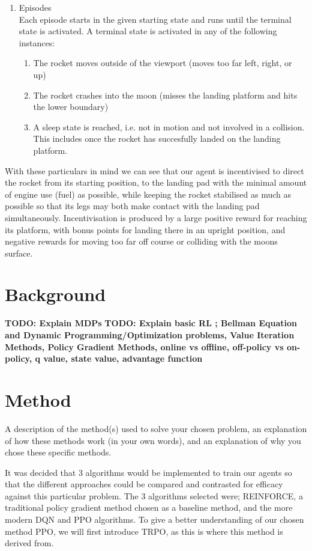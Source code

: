 \documentclass{article}
\begin{document}
\begin{enumerate}
  \item Episodes\\
  Each episode starts in the given starting state and runs until the terminal state is activated. A terminal state is activated in any of the following instances:
  \begin{enumerate}
    \item The rocket moves outside of the viewport (moves too far left, right, or up)
    \item The rocket crashes into the moon (misses the landing platform and hits the lower boundary)
    \item A sleep state is reached, i.e. not in motion and not involved in a collision. This includes once the rocket has succesfully landed on the landing platform.
  \end{enumerate}
\end{enumerate}

With these particulars in mind we can see that our agent is incentivised to direct the rocket from its starting position, to the landing pad with the minimal amount of engine use (fuel) as possible, while keeping the rocket stabilised as much as possible so that its legs may both make contact with the landing pad simultaneously. Incentivisation is produced by a large positive reward for reaching its platform, with bonus points for landing there in an upright position, and negative rewards for moving too far off course or colliding with the moons surface.


\section{Background}
\textbf{TODO: Explain MDPs}
\textbf{TODO: Explain basic RL ; Bellman Equation and Dynamic Programming/Optimization problems, Value Iteration Methods, Policy Gradient Methods, online vs offline, off-policy vs on-policy, q value, state value, advantage function}

\section{Method}
A description of the method(s) used to solve your chosen problem, an explanation
of how these methods work (in your own words), and an explanation of why you chose these
specific methods.\\\newline

It was decided that 3 algorithms would be implemented to train our agents so that the different approaches could be compared and contrasted for efficacy against this particular problem. The 3 algorithms selected were; REINFORCE, a traditional policy gradient method chosen as a baseline method, and the more modern DQN and PPO algorithms. To give a better understanding of our chosen method PPO, we will first introduce TRPO, as this is where this method is derived from. 
\end{document}
